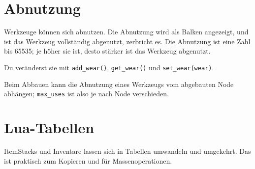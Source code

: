 \section{Abnutzung}\label{abnutzung}

Werkzeuge können sich abnutzen. Die Abnutzung
wird als Balken angezeigt, und ist das Werkzeug vollständig abgenutzt,
zerbricht es. Die Abnutzung ist eine Zahl bis 65535; je höher sie ist,
desto stärker ist das Werkzeug abgenutzt.

Du veränderst sie mit \texttt{add\_\allowbreak{}wear()},
\texttt{get\_\allowbreak{}wear()} und
\texttt{set\_\allowbreak{}wear(wear)}.

\begin{Shaded}
\begin{Highlighting}[]
  \OperatorTok{=}\OperatorTok{(}\OperatorTok{)}
  \OperatorTok{=} 

\OperatorTok{:}\OperatorTok{(} \OperatorTok{/} \OperatorTok{(} \OperatorTok{{-}} \OperatorTok{))}
\end{Highlighting}
\end{Shaded}

Beim Abbauen kann die Abnutzung eines Werkzeugs vom abgebauten Node
abhängen; \texttt{max\_\allowbreak{}uses} ist also je nach Node
verschieden.

\section{Lua-Tabellen}\label{lua-tabellen}

ItemStacks und Inventare lassen sich in Tabellen umwandeln und
umgekehrt. Das ist praktisch zum Kopieren und für Massenoperationen.

\begin{Shaded}
\begin{Highlighting}[]
  \OperatorTok{=} \OperatorTok{:}\OperatorTok{()}
\OperatorTok{:}\OperatorTok{(}\OperatorTok{)}

  \OperatorTok{=} \OperatorTok{:}\OperatorTok{(}\OperatorTok{)}
\OperatorTok{:}\OperatorTok{(}\OperatorTok{,} \OperatorTok{)}
\end{Highlighting}
\end{Shaded}

